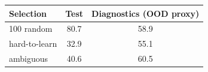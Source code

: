 \begin{tabular}{lcc}
Selection & Test & Diagnostics (OOD proxy) \\
\hline
100%
random & 80.7 & 58.9 \\
hard-to-learn & 32.9 & 55.1 \\
ambiguous & 40.6 & 60.5 \\
\end{tabular}
